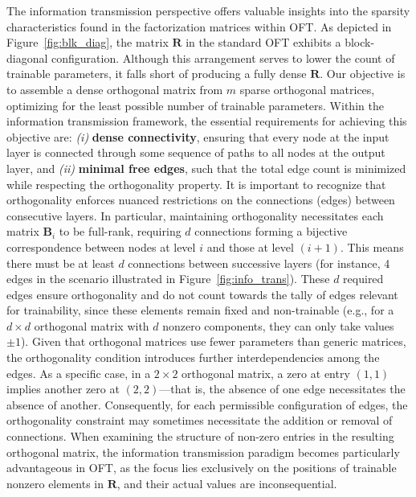 The information transmission perspective offers valuable insights into the sparsity characteristics found in the factorization matrices within OFT. As depicted in Figure~\ref{fig:blk_diag}, the matrix $\bm{R}$ in the standard OFT exhibits a block-diagonal configuration. Although this arrangement serves to lower the count of trainable parameters, it falls short of producing a fully dense $\bm{R}$. Our objective is to assemble a dense orthogonal matrix from $m$ sparse orthogonal matrices, optimizing for the least possible number of trainable parameters. Within the information transmission framework, the essential requirements for achieving this objective are: \emph{(i)} \textbf{dense connectivity}, ensuring that every node at the input layer is connected through some sequence of paths to all nodes at the output layer, and \emph{(ii)} \textbf{minimal free edges}, such that the total edge count is minimized while respecting the orthogonality property. It is important to recognize that orthogonality enforces nuanced restrictions on the connections (edges) between consecutive layers. In particular, maintaining orthogonality necessitates each matrix $\bm{B}_i$ to be full-rank, requiring $d$ connections forming a bijective correspondence between nodes at level $i$ and those at level $(i+1)$. This means there must be at least $d$ connections between successive layers (for instance, 4 edges in the scenario illustrated in Figure~\ref{fig:info_trans}). These $d$ required edges ensure orthogonality and do not count towards the tally of edges relevant for trainability, since these elements remain fixed and non-trainable (e.g., for a $d\times d$ orthogonal matrix with $d$ nonzero components, they can only take values $\pm 1$). Given that orthogonal matrices use fewer parameters than generic matrices, the orthogonality condition introduces further interdependencies among the edges. As a specific case, in a $2\times 2$ orthogonal matrix, a zero at entry $(1,1)$ implies another zero at $(2,2)$—that is, the absence of one edge necessitates the absence of another. Consequently, for each permissible configuration of edges, the orthogonality constraint may sometimes necessitate the addition or removal of connections. When examining the structure of non-zero entries in the resulting orthogonal matrix, the information transmission paradigm becomes particularly advantageous in OFT, as the focus lies exclusively on the positions of trainable nonzero elements in $\bm{R}$, and their actual values are inconsequential.

